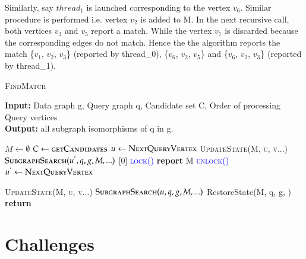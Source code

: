 Similarly, say $thread_1$ is launched corresponding to the vertex $v_6$. Similar procedure is performed i.e. vertex $v_2$ is added to M. In the next recursive call, both vertices $v_3$ and $v_5$ report a match. While the vertex $v_7$ is discarded because the corresponding edges do not match. Hence the the algorithm reports the match \{$v_1$, $v_2$, $v_3$\} (reported by thread\_0), \{$v_6$, $v_2$, $v_5$\} and \{$v_6$, $v_2$, $v_3$\} (reported by thread\_1).

\begin{frame}{}
    \begin{algorithm}
\caption{\textsc{FindMatch}}\label{euclid}
\textbf{Input:} Data graph g, Query graph q, Candidate set C, Order of processing Query vertices\\
\textbf{Output:} all subgraph isomorphisms of q in g.

\begin{algorithmic}[1]
\State $M \gets \emptyset$
\State $C \gets \textsc{getCandidates}$
\State $u \gets \textsc{NextQueryVertex}$
\State \textsc{UpdateState(M, u, v...)}\\
\Comment{\textcolor{green}{For each $u' \in C(u)$, we launch a thread. each of which performs following operation}}
\State $\textsc{SubgraphSearch}(u^{'}, q, g, M,...)$ 
[0]
    \State \textsc{\textcolor{blue}{lock()}}
    \State \textbf{report} M
    \State \textsc{\textcolor{blue}{unlock()}}
    \Else
    \State $u^{'} \gets \textsc{NextQueryVertex}$
    
        
    
                    \State \textsc{UpdateState(M, u, v...)}
                    \State $\textsc{SubgraphSearch}(u, q, g, M,...)$
            \Else
                    \State RestoreState(M, q, g, )
                    \State \textbf{return}
            \EndIf
        \EndIf

    \EndFor
    
\EndIf
\EndProcedure{}
\end{algorithmic}
\end{algorithm}
\end{frame}


\section{Challenges}

